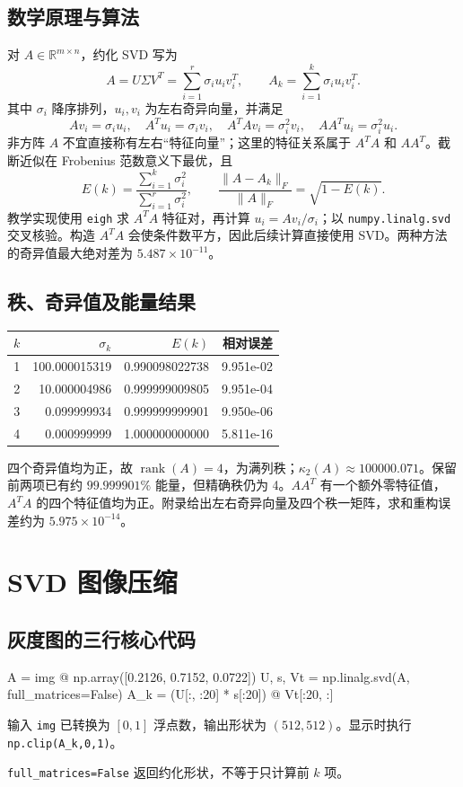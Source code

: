 \documentclass[UTF8,a4paper,11pt,fontset=fandol]{ctexart}
\begin{document}
\subsection{数学原理与算法}
对 $A\in\mathbb R^{m\times n}$，约化 SVD 写为
\[
 A=U\Sigma V^T=\sum_{i=1}^{r}\sigma_i u_i v_i^T,\qquad
 A_k=\sum_{i=1}^{k}\sigma_i u_i v_i^T.
\]
其中 $\sigma_i$ 降序排列，$u_i,v_i$ 为左右奇异向量，并满足
\[
 Av_i=\sigma_i u_i,\quad A^Tu_i=\sigma_i v_i,\quad
 A^TAv_i=\sigma_i^2v_i,\quad AA^Tu_i=\sigma_i^2u_i.
\]
非方阵 $A$ 不宜直接称有左右“特征向量”；这里的特征关系属于 $A^TA$ 和 $AA^T$。截断近似在 Frobenius 范数意义下最优，且
\[
 E(k)=\frac{\sum_{i=1}^k\sigma_i^2}{\sum_{i=1}^r\sigma_i^2},\qquad
 \frac{\|A-A_k\|_F}{\|A\|_F}=\sqrt{1-E(k)}.
\]
教学实现使用 \texttt{eigh} 求 $A^TA$ 特征对，再计算 $u_i=Av_i/\sigma_i$；以 \texttt{numpy.linalg.svd} 交叉核验。构造 $A^TA$ 会使条件数平方，因此后续计算直接使用 SVD。两种方法的奇异值最大绝对差为 $5.487\times10^{-11}$。
\subsection{秩、奇异值及能量结果}


\begin{center}\small\begin{tabular}{rrrr}\toprule{}$k$ & $\sigma_k$ & $E(k)$ & 相对误差\\\midrule
1 & 100.000015319 & 0.990098022738 & 9.951e-02\\
2 & 10.000004986 & 0.999999009805 & 9.951e-04\\
3 & 0.099999934 & 0.999999999901 & 9.950e-06\\
4 & 0.000999999 & 1.000000000000 & 5.811e-16\\\bottomrule\end{tabular}\end{center}

四个奇异值均为正，故 $\operatorname{rank}(A)=4$，为满列秩；$\kappa_2(A)\approx100000.071$。保留前两项已有约 $99.999901\%$ 能量，但精确秩仍为 4。$AA^T$ 有一个额外零特征值，$A^TA$ 的四个特征值均为正。附录给出左右奇异向量及四个秩一矩阵，求和重构误差约为 $5.975\times10^{-14}$。
\section{SVD 图像压缩}
\subsection{灰度图的三行核心代码}
\par\noindent\begin{minipage}{\linewidth}\begin{code}
A = img @ np.array([0.2126, 0.7152, 0.0722])
U, s, Vt = np.linalg.svd(A, full_matrices=False)
A_k = (U[:, :20] * s[:20]) @ Vt[:20, :]
\end{code}
\end{minipage}\par
输入 \texttt{img} 已转换为 $[0,1]$ 浮点数，输出形状为 $(512,512)$。显示时执行 \texttt{np.clip(A\_k,0,1)}。\par\texttt{full\_matrices=False} 返回约化形状，不等于只计算前 $k$ 项。
\end{document}
